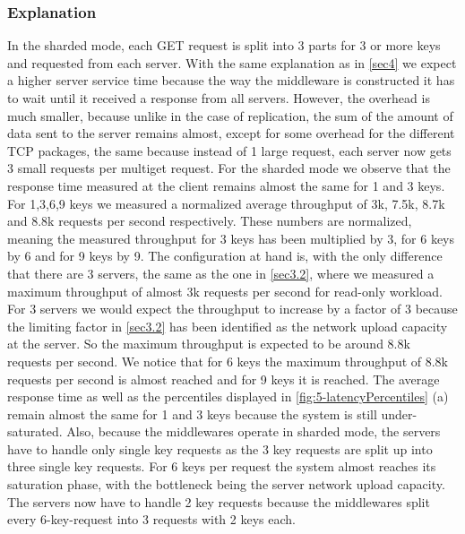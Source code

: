 \documentclass[11pt,a4paper]{article}
\begin{document}
\subsubsection{Explanation}
In the sharded mode, each GET request is split into 3 parts for 3 or more keys and requested from each server. With the same explanation as in \autoref{sec4} we expect a higher server service time because the way the middleware is constructed it has to wait until it received a response from all servers. However, the overhead is much smaller, because unlike in the case of replication, the sum of the amount of data sent to the server remains almost, except for some overhead for the different TCP packages, the same because instead of 1 large request, each server now gets 3 small requests per multiget request.
For the sharded mode we observe that the response time measured at the client remains almost the same for 1 and 3 keys. For 1,3,6,9 keys we measured a normalized average throughput of 3k, 7.5k, 8.7k and 8.8k requests per second respectively. These numbers are normalized, meaning the measured throughput for 3 keys has been multiplied by 3, for 6 keys by 6 and for 9 keys by 9.
The configuration at hand is, with the only difference that there are 3 servers, the same as the one in \autoref{sec3.2}, where we measured a maximum throughput of almost 3k requests per second for read-only workload. For 3 servers we would expect the throughput to increase by a factor of 3 because the limiting factor in \autoref{sec3.2} has been identified as the network upload capacity at the server. So the maximum throughput is expected to be around 8.8k requests per second.
We notice that for 6 keys the maximum throughput of 8.8k requests per second is almost reached and for 9 keys it is reached.
The average response time as well as the percentiles displayed in \autoref{fig:5-latencyPercentiles} (a) remain almost the same for 1 and 3 keys because the system is still under-saturated. Also, because the middlewares operate in sharded mode, the servers have to handle only single key requests as the 3 key requests are split up into three single key requests.
For 6 keys per request the system almost reaches its saturation phase, with the bottleneck being the server network upload capacity. The servers now have to handle 2 key requests because the middlewares split every 6-key-request into 3 requests with 2 keys each.
\end{document}
